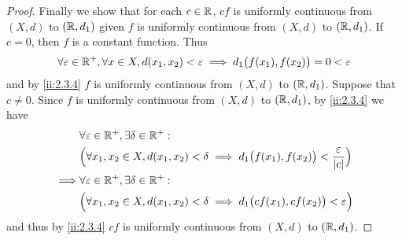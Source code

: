 \begin{proof}
  Finally we show that for each \(c \in \mathbb{R}\), \(cf\) is uniformly continuous from \((X, d)\) to \((\mathbb{R}, d_1)\) given \(f\) is uniformly continuous from \((X, d)\) to \((\mathbb{R}, d_1)\).
  If \(c = 0\), then \(f\) is a constant function.
  Thus
  \[
    \forall \varepsilon \in \mathbb{R}^+, \forall x \in X, d(x_1, x_2) < \varepsilon \implies d_1\big(f(x_1), f(x_2)\big) = 0 < \varepsilon
  \]
  and by \cref{ii:2.3.4} \(f\) is uniformly continuous from \((X, d)\) to \((\mathbb{R}, d_1)\).
  Suppose that \(c \neq 0\).
  Since \(f\) is uniformly continuous from \((X, d)\) to \((\mathbb{R}, d_1)\), by \cref{ii:2.3.4} we have
  \begin{align*}
             & \forall \varepsilon \in \mathbb{R}^+, \exists \delta \in \mathbb{R}^+:                                                                     \\
             & \Big(\forall x_1, x_2 \in X, d(x_1, x_2) < \delta \implies d_1\big(f(x_1), f(x_2)\big) < \dfrac{\varepsilon}{\left\lvert c\right\rvert}\Big) \\
    \implies & \forall \varepsilon \in \mathbb{R}^+, \exists \delta \in \mathbb{R}^+:                                                                     \\
             & \Big(\forall x_1, x_2 \in X, d(x_1, x_2) < \delta \implies d_1\big(cf(x_1), cf(x_2)\big) < \varepsilon\Big)
  \end{align*}
  and thus by \cref{ii:2.3.4} \(cf\) is uniformly continuous from \((X, d)\) to \((\mathbb{R}, d_1)\).
\end{proof}

